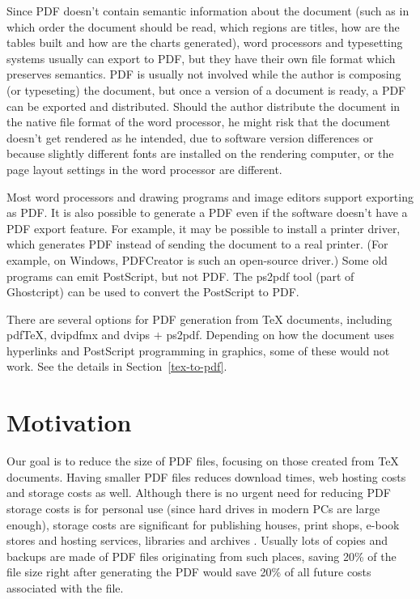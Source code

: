 \documentclass{ltugproc}
\def\cmd{\textsf}
\begin{document}
Since PDF doesn't contain semantic information about the document (such as
in which order the document should be read, which regions are titles, how
are the tables built and how are the charts generated), word processors and
typesetting systems usually can export to PDF, but they have their own file
format which preserves semantics. PDF is usually not involved while the
author is composing (or typeseting) the document, but once a version of a
document is ready, a PDF can be exported and distributed. Should the author
distribute the document in the native file format of the word processor, he
might risk that the document doesn't get rendered as he intended, due to
software version differences or because slightly different fonts are
installed on the rendering computer, or the page layout settings in the word
processor are different.

Most word processors and drawing programs and image editors support
exporting as PDF. It is also possible to generate a PDF even if the software
doesn't have a PDF export feature. For example, it may be possible to
install a printer driver, which generates PDF instead of sending the
document to a real printer. (For example, on Windows, PDFCreator
\cite{pdfcreator} is such an open-source driver.) Some old programs can emit
PostScript, but not PDF. The \cmd{ps2pdf} \cite{ps2df} tool (part of
Ghostcript) can be used to convert the PostScript to PDF.

There are several options for PDF generation from
\TeX{} documents, including
pdf\TeX{}, \cmd{dvipdfmx} and \cmd{dvips} $+$ \cmd{ps2pdf}. Depending on how
the document uses hyperlinks and PostScript programming in graphics, some of
these would not work. See the details in Section~\ref{tex-to-pdf}.

\section{Motivation}

Our goal is to reduce the size of PDF files, focusing on those
created from \TeX{} documents. Having smaller PDF files reduces download
times, web hosting costs and storage costs as well. Although there is no
urgent need for reducing PDF storage costs is for personal use (since hard
drives in modern PCs are large enough), storage costs are significant for
publishing houses, print shops, e-book stores and hosting services,
libraries and archives \cite{multivalent-article}.
Usually lots of copies and backups are made of PDF
files originating from such places, saving 20\% of the file size right after
generating the PDF would save 20\% of all future costs associated with the
file.
\end{document}
